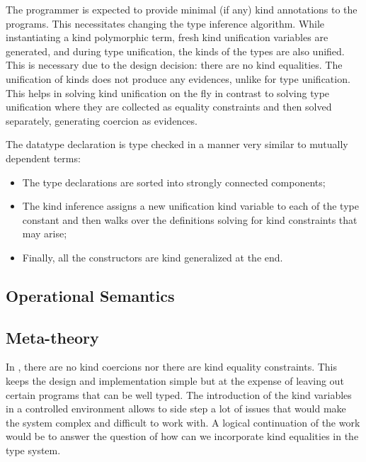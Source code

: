 \documentclass[screen,nonacm,manuscript,review]{acmart} %
\begin{document}
The programmer is expected to provide minimal (if any) kind annotations to the programs. This necessitates changing the type inference algorithm. While instantiating a kind polymorphic term, fresh kind unification variables are generated, and during type unification, the kinds of the types are also unified. This is necessary due to the design decision: there are no kind equalities. The unification of kinds does not produce any evidences, unlike for type unification. This helps in solving kind unification on the fly in contrast to solving type unification where they are collected as equality constraints and then solved separately, generating coercion as evidences.


The datatype declaration is type checked in a manner very similar to mutually dependent terms:
\begin{itemize}
\item The type declarations are sorted into strongly connected components;
\item The kind inference assigns a new unification kind variable to each of the type constant and then walks over the definitions solving for kind constraints that may arise;
\item Finally, all the constructors are kind generalized at the end.
\end{itemize}

\subsection{Operational Semantics}\label{sec:sfp-opsem}

\subsection{Meta-theory}\label{sec:sfp-metatheory}

In \SFP, there are no kind coercions nor there are kind equality
constraints. This keeps the design and implementation simple but at
the expense of leaving out certain programs that can be well
typed. The introduction of the kind variables in a controlled environment allows to
side step a lot of issues that would make the system complex and difficult to work with.
A logical continuation of the work would be to answer the
question of how can we incorporate kind equalities in the type system.
\end{document}
